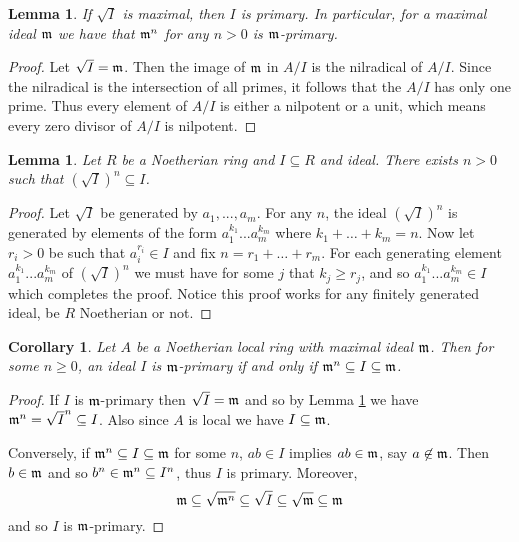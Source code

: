 \documentclass[12pt]{article}
\theoremstyle{plain}
\newtheorem{lemma}[thm]{Lemma}
\newtheorem{cor}[thm]{Corollary}
\theoremstyle{definition}
\begin{document}
\begin{lemma}
If $\sqrt{I}$ is maximal, then $I$ is primary. In particular, for a maximal ideal $\frak{m}$ we have that $\frak{m}^n$ for any $n > 0$ is $\frak{m}$-primary.
\end{lemma}
\begin{proof}
Let $\sqrt{I} = \frak{m}$. Then the image of $\frak{m}$ in $A/I$ is the nilradical of $A/I$. Since the nilradical is the intersection of all primes, it follows that the $A/I$ has only one prime. Thus every element of $A/I$ is either a nilpotent or a unit, which means every zero divisor of $A/I$ is nilpotent.
\end{proof}
\begin{lemma}
\label{lem:radical_power} Let $R$ be a Noetherian ring and $I \subseteq R$ and ideal. There exists $n > 0$ such that $(\sqrt{I})^n \subseteq I$.
\end{lemma}
\begin{proof}
Let $\sqrt{I}$ be generated by $a_1,...,a_m$. For any $n$, the ideal $(\sqrt{I})^n$ is generated by elements of the form $a_1^{k_1}...a_m^{k_m}$ where $k_1 + \hdots + k_m = n$. Now let $r_i>0$ be such that $a_i^{r_i} \in I$ and fix $n = r_1 + \hdots + r_m$. For each generating element $a_1^{k_1}...a_m^{k_m}$ of $(\sqrt{I})^n$ we must have for some $j$ that $k_j \geq r_j$, and so $a_1^{k_1}...a_m^{k_m} \in I$ which completes the proof. Notice this proof works for any finitely generated ideal, be $R$ Noetherian or not.
\end{proof}
\begin{cor}
\label{cor:primary_ideals_nested}
Let $A$ be a Noetherian local ring with maximal ideal $\frak{m}$. Then for some $n \geq 0$, an ideal $I$ is $\frak{m}$-primary if and only if $\frak{m}^n \subseteq I \subseteq \frak{m}$.
\end{cor}
\begin{proof}
If $I$ is $\frak{m}$-primary then $\sqrt{I} = \frak{m}$ and so by Lemma \ref{lem:radical_power} we have $\frak{m}^n = \sqrt{I}^n \subseteq I$. Also since $A$ is local we have $I \subseteq \frak{m}$.

Conversely, if $\frak{m}^n \subseteq I \subseteq \frak{m}$ for some $n$, $ab \in I$ implies $ab \in \frak{m}$, say $a \not\in \frak{m}$. Then $b \in \frak{m}$ and so $b^n \in \frak{m}^n \subseteq I^n$, thus $I$ is primary. Moreover,
\[\frak{m} \subseteq \sqrt{\frak{m}^n} \subseteq \sqrt{I} \subseteq \sqrt{\frak{m}} \subseteq \frak{m}\]
and so $I$ is $\frak{m}$-primary.
\end{proof}
\end{document}
